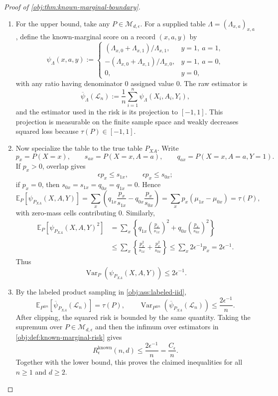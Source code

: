 \begin{proof}[Proof of \cref{obj:thm:known-marginal-boundary}]
\begin{enumerate}
\item
For the upper bound, take any \(P\in\mathcal M_{d,\epsilon}\).  For a supplied table \(\Lambda=(\Lambda_{x,a})_{x,a}\), define the known-marginal score on a record \((x,a,y)\) by
\[
\psi_{\Lambda}(x,a,y)
:=
\begin{cases}
(\Lambda_{x,0}+\Lambda_{x,1})/\Lambda_{x,1}, & y=1,\ a=1,\\
-(\Lambda_{x,0}+\Lambda_{x,1})/\Lambda_{x,0}, & y=1,\ a=0,\\
0, & y=0,
\end{cases}
\]
with any ratio having denominator \(0\) assigned value \(0\).  The raw estimator is
\[
\overline\psi_{\Lambda}(\mathcal L_n)
:=
\frac1n\sum_{i=1}^n \psi_{\Lambda}(X_i,A_i,Y_i),
\]
and the estimator used in the risk is its projection to \([-1,1]\).  This projection is measurable on the finite sample space and weakly decreases squared loss because \(\tau(P)\in[-1,1]\). %

\item
Now specialize the table to the true table \(P_{XA}\).  Write
\[
p_x=P(X=x),\qquad
s_{ax}=P(X=x,A=a),\qquad
q_{ax}=P(X=x,A=a,Y=1).
\]
If \(p_x>0\), overlap gives
\[
\epsilon p_x\le s_{1x},
\qquad
\epsilon p_x\le s_{0x};
\]
if \(p_x=0\), then \(s_{0x}=s_{1x}=q_{0x}=q_{1x}=0\).  Hence
\[
\mathbb E_P[\psi_{P_{XA}}(X,A,Y)]
=
\sum_x\left(q_{1x}\frac{p_x}{s_{1x}}-q_{0x}\frac{p_x}{s_{0x}}\right)
=
\sum_x p_x(\mu_{1x}-\mu_{0x})
=
\tau(P),
\]
with zero-mass cells contributing \(0\).  Similarly,
\[
\begin{aligned}
\mathbb E_P[\psi_{P_{XA}}(X,A,Y)^2]
&=
\sum_x\left\{
q_{1x}\left(\frac{p_x}{s_{1x}}\right)^2
+
q_{0x}\left(\frac{p_x}{s_{0x}}\right)^2
\right\} \\
&\le
\sum_x\left\{
\frac{p_x^2}{s_{1x}}
+
\frac{p_x^2}{s_{0x}}
\right\}
\le
\sum_x 2\epsilon^{-1}p_x
=
2\epsilon^{-1}.
\end{aligned}
\]
Thus
\[
\operatorname{Var}_P\!\left(\psi_{P_{XA}}(X,A,Y)\right)
\le 2\epsilon^{-1}.
\]

\item
By the labeled product sampling in \cref{obj:ass:labeled-iid},
\[
\mathbb E_{P^{\otimes n}}\!\left[\overline\psi_{P_{XA}}(\mathcal L_n)\right]
=\tau(P),
\qquad
\operatorname{Var}_{P^{\otimes n}}\!\left(\overline\psi_{P_{XA}}(\mathcal L_n)\right)
\le
\frac{2\epsilon^{-1}}{n}.
\]
After clipping, the squared risk is bounded by the same quantity.  Taking the supremum over \(P\in\mathcal M_{d,\epsilon}\) and then the infimum over estimators in \cref{obj:def:known-marginal-risk} gives
\[
R_\epsilon^{\mathrm{known}}(n,d)
\le
\frac{2\epsilon^{-1}}{n}
=
\frac{C_\epsilon}{n}.
\]
Together with the lower bound, this proves the claimed inequalities for all \(n\ge1\) and \(d\ge2\). %
\end{enumerate}
\end{proof}

